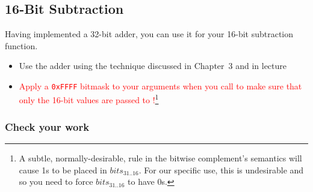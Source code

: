 \subsection{16-Bit Subtraction}

Having implemented a 32-bit adder, you can use it for your 16-bit subtraction function.

\begin{description}
        \begin{itemize}
            \item Use the adder using the technique discussed in Chapter~3 and in lecture
            \item \textcolor{red}{Apply a \texttt{0xFFFF} bitmask to your arguments when you call  to make sure that only the 16-bit values are passed to !}\footnote{
                A subtle, normally-desirable, rule in the bitwise complement's semantics will cause 1s to be placed in $bits_{31..16}$.
                For our specific use, this is undesirable and so you need to force $bits_{31..16}$ to have 0s.
            }
        \end{itemize}
\end{description}


\subsubsection*{Check your work}

